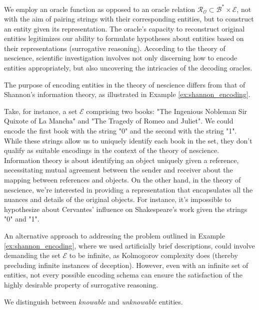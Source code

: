 We employ an oracle function as opposed to an oracle relation $\mathcal{R}_\mathcal{O} \subset \mathcal{B}^\ast \times \mathcal{E}$, not with the aim of pairing strings with their corresponding entities, but to construct an entity given its representation. The oracle's capacity to reconstruct original entities legitimizes our ability to formulate hypotheses about entities based on their representations (surrogative reasoning). According to the theory of nescience, scientific investigation involves not only discerning how to encode entities appropriately, but also uncovering the intricacies of the decoding oracles. 

The purpose of encoding entities in the theory of nescience differs from that of Shannon's information theory, as illustrated in Example \ref{ex:shannon_encoding}.

\begin{example}
\label{ex:shannon_encoding}
Take, for instance, a set $\mathcal{E}$ comprising two books: "The Ingenious Nobleman Sir Quixote of La Mancha" and "The Tragedy of Romeo and Juliet". We could encode the first book with the string "0" and the second with the string "1". While these strings allow us to uniquely identify each book in the set, they don't qualify as suitable encodings in the context of the theory of nescience. Information theory is about identifying an object uniquely given a reference, necessitating mutual agreement between the sender and receiver about the mapping between references and objects. On the other hand, in the theory of nescience, we're interested in providing a representation that encapsulates all the nuances and details of the original objects. For instance, it's impossible to hypothesize about Cervantes' influence on Shakespeare's work given the strings "0" and "1".
\end{example}

An alternative approach to addressing the problem outlined in Example \ref{ex:shannon_encoding}, where we used artificially brief descriptions, could involve demanding the set $\mathcal{E}$ to be infinite, as Kolmogorov complexity does (thereby precluding infinite instances of deception). However, even with an infinite set of entities, not every possible encoding schema can ensure the satisfaction of the highly desirable property of surrogative reasoning.









We distinguish between \emph{knowable} and \emph{unknowable} entities.

